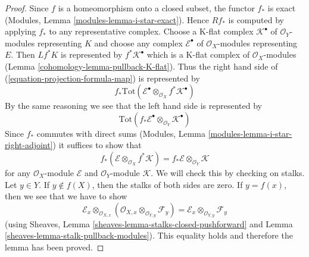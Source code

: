 \begin{proof}

Since $f$ is a homeomorphism onto a closed subset, the functor $f_*$
is exact (Modules, Lemma \ref{modules-lemma-i-star-exact}). Hence
$Rf_*$ is computed by applying $f_*$ to any representative complex.
Choose a K-flat complex $\mathcal{K}^\bullet$ of $\mathcal{O}_Y$-modules
representing $K$ and choose any complex $\mathcal{E}^\bullet$
of $\mathcal{O}_X$-modules representing $E$. Then
$Lf^*K$ is represented by $f^*\mathcal{K}^\bullet$ which is
a K-flat complex of $\mathcal{O}_X$-modules
(Lemma \ref{cohomology-lemma-pullback-K-flat}). Thus the right hand side of
(\ref{equation-projection-formula-map}) is represented by
$$
f_*\text{Tot}(\mathcal{E}^\bullet
\otimes_{\mathcal{O}_X} f^*\mathcal{K}^\bullet)
$$
By the same reasoning we see that the left hand side is represented by
$$
\text{Tot}(f_*\mathcal{E}^\bullet \otimes_{\mathcal{O}_Y} \mathcal{K}^\bullet)
$$
Since $f_*$ commutes with direct sums
(Modules, Lemma \ref{modules-lemma-i-star-right-adjoint})
it suffices to show that
$$
f_*(\mathcal{E} \otimes_{\mathcal{O}_X} f^*\mathcal{K}) =
f_*\mathcal{E} \otimes_{\mathcal{O}_Y} \mathcal{K}
$$
for any $\mathcal{O}_X$-module $\mathcal{E}$ and $\mathcal{O}_Y$-module
$\mathcal{K}$. We will check this by checking on stalks.
Let $y \in Y$. If $y \not \in f(X)$, then the stalks
of both sides are zero. If $y = f(x)$, then we see that we have to show
$$
\mathcal{E}_x \otimes_{\mathcal{O}_{X, x}}
(\mathcal{O}_{X, x} \otimes_{\mathcal{O}_{Y, y}} \mathcal{F}_y) =
\mathcal{E}_x \otimes_{\mathcal{O}_{Y, y}} \mathcal{F}_y
$$
(using Sheaves, Lemma \ref{sheaves-lemma-stalks-closed-pushforward}
and Lemma \ref{sheaves-lemma-stalk-pullback-modules}).
This equality holds and therefore the lemma has been proved.
\end{proof}


